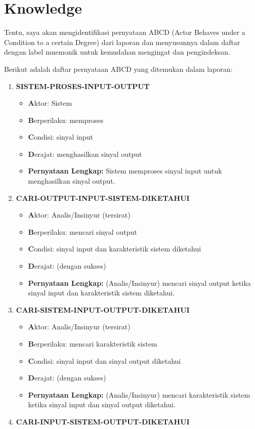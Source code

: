 \documentclass[
  letterpaper,
  DIV=11,
  numbers=noendperiod]{scrreprt}
\begin{document}

\chapter{Knowledge}\label{knowledge}

Tentu, saya akan mengidentifikasi pernyataan ABCD (Actor Behaves under a
Condition to a certain Degree) dari laporan dan menyusunnya dalam daftar
dengan label mnemonik untuk kemudahan mengingat dan pengindeksan.

Berikut adalah daftar pernyataan ABCD yang ditemukan dalam laporan:

\begin{enumerate}
\def\labelenumi{\arabic{enumi}.}
\item
  \textbf{SISTEM-PROSES-INPUT-OUTPUT}

  \begin{itemize}
  \item
    \textbf{A}ktor: Sistem
  \item
    \textbf{B}erperilaku: memproses
  \item
    \textbf{C}ondisi: sinyal input
  \item
    \textbf{D}erajat: menghasilkan sinyal output
  \item
    \textbf{Pernyataan Lengkap:} Sistem memproses sinyal input untuk
    menghasilkan sinyal output.
  \end{itemize}
\item
  \textbf{CARI-OUTPUT-INPUT-SISTEM-DIKETAHUI}

  \begin{itemize}
  \item
    \textbf{A}ktor: Analis/Insinyur (tersirat)
  \item
    \textbf{B}erperilaku: mencari sinyal output
  \item
    \textbf{C}ondisi: sinyal input dan karakteristik sistem diketahui
  \item
    \textbf{D}erajat: (dengan sukses)
  \item
    \textbf{Pernyataan Lengkap:} (Analis/Insinyur) mencari sinyal output
    ketika sinyal input dan karakteristik sistem diketahui.
  \end{itemize}
\item
  \textbf{CARI-SISTEM-INPUT-OUTPUT-DIKETAHUI}

  \begin{itemize}
  \item
    \textbf{A}ktor: Analis/Insinyur (tersirat)
  \item
    \textbf{B}erperilaku: mencari karakteristik sistem
  \item
    \textbf{C}ondisi: sinyal input dan sinyal output diketahui
  \item
    \textbf{D}erajat: (dengan sukses)
  \item
    \textbf{Pernyataan Lengkap:} (Analis/Insinyur) mencari karakteristik
    sistem ketika sinyal input dan sinyal output diketahui.
  \end{itemize}
\item
  \textbf{CARI-INPUT-SISTEM-OUTPUT-DIKETAHUI}


\end{enumerate}
\end{document}
